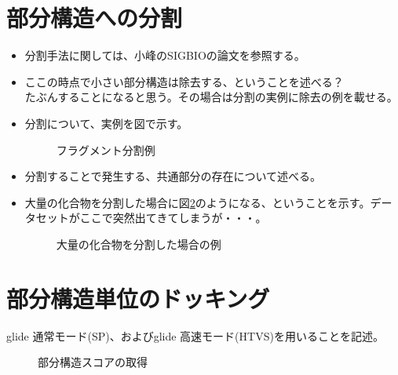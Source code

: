 \section{部分構造への分割}

\begin{itemize}
\item 分割手法に関しては、小峰のSIGBIOの論文を参照する。\citetodo{}
\item ここの時点で小さい部分構造は除去する、ということを述べる？\\
たぶんすることになると思う。その場合は分割の実例に除去の例を載せる。
\item 分割について、実例を図で示す。

\begin{figure}[htp]
 \begin{center}
  \caption{フラグメント分割例}
  \label{fig:ex_decomposition}
 \end{center}
\end{figure}

\item 分割することで発生する、共通部分の存在について述べる。
\item 大量の化合物を分割した場合に図\ref{fig:decomposition_amount}のようになる、ということを示す。データセットがここで突然出てきてしまうが・・・。

\begin{figure}[htp]
 \begin{center}
  \caption{大量の化合物を分割した場合の例}
  \label{fig:decomposition_amount}
 \end{center}
\end{figure}

\end{itemize}

\section{部分構造単位のドッキング}
glide 通常モード(SP)、およびglide 高速モード(HTVS)を用いることを記述。


\begin{figure}[htp]
 \begin{center}
  \caption{部分構造スコアの取得}
  \label{fig:fragment_result}
 \end{center}
\end{figure}

